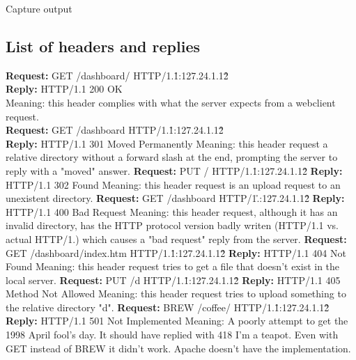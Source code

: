 \documentclass[11pt,a4paper]{report}
\begin{document}
        Capture output

    \subsection{List of headers and replies}
            \textbf{Request:} GET /dashboard/ HTTP/1.1\r\nHost:127.24.1.12\r\n\r\n \\
            \textbf{Reply:} HTTP/1.1 200 OK \\
                Meaning: this header complies with what the server expects from a webclient request. \\
            \textbf{Request:} GET /dashboard HTTP/1.1\r\nHost:127.24.1.12\r\n\r\n \\
            \textbf{Reply:} HTTP/1.1 301 Moved Permanently
                Meaning: this header request a relative directory without a forward slash at the end, prompting the server to reply with a "moved" answer.
            \textbf{Request:} PUT / HTTP/1.1\r\nHost:127.24.1.12\r\n\r\n
            \textbf{Reply:} HTTP/1.1 302 Found
                Meaning: this header request is an upload request to an unexistent directory.
            \textbf{Request:} GET /dashboard HTTP/1.\r\nHost:127.24.1.12\r\n\r\n
            \textbf{Reply:} HTTP/1.1 400 Bad Request
                Meaning: this header request, although it has an invalid directory, has the HTTP protocol version badly writen (HTTP/1.1 vs. actual HTTP/1.) which causes a "bad request" reply from the server.
            \textbf{Request:} GET /dashboard/index.htm HTTP/1.1\r\nHost:127.24.1.12\r\n\r\n
            \textbf{Reply:} HTTP/1.1 404 Not Found
                Meaning: this header request tries to get a file that doesn't exist in the local server.
            \textbf{Request:} PUT /d HTTP/1.1\r\nHost:127.24.1.12\r\n\r\n
            \textbf{Reply:} HTTP/1.1 405 Method Not Allowed
                Meaning: this header request tries to upload something to the relative directory "d".
            \textbf{Request:} BREW /coffee/ HTTP/1.1\r\nHost:127.24.1.12\r\n\r\n
            \textbf{Reply:} HTTP/1.1 501 Not Implemented
                Meaning: A poorly attempt to get the 1998 April fool's day. It should have replied with 418 I'm a teapot. Even with GET instead of BREW it didn't work. Apache doesn't have the implementation.
\end{document}
